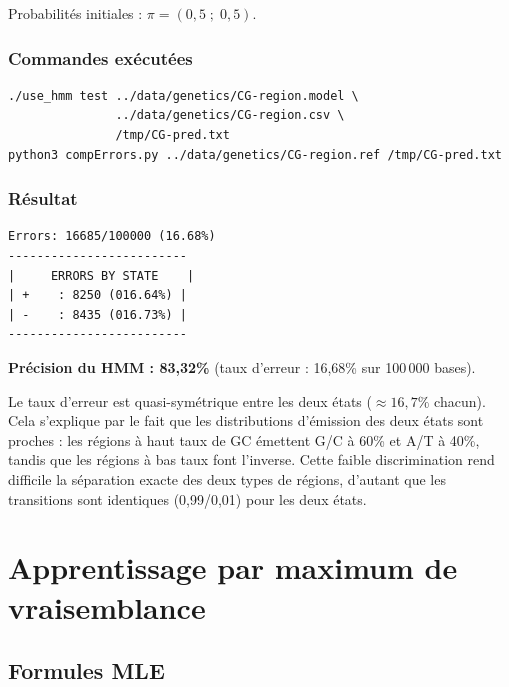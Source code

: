 \documentclass[12pt,a4paper]{article}
\begin{document}
Probabilités initiales : $\pi = (0{,}5 \;;\; 0{,}5)$.

\subsubsection*{Commandes exécutées}

\begin{lstlisting}[style=bashstyle]
./use_hmm test ../data/genetics/CG-region.model \
               ../data/genetics/CG-region.csv \
               /tmp/CG-pred.txt
python3 compErrors.py ../data/genetics/CG-region.ref /tmp/CG-pred.txt
\end{lstlisting}

\subsubsection*{Résultat}

\begin{lstlisting}[style=outputstyle]
Errors: 16685/100000 (16.68%)
-------------------------
|     ERRORS BY STATE    |
| +    : 8250 (016.64%) |
| -    : 8435 (016.73%) |
-------------------------
\end{lstlisting}

\begin{resultbox}
\textbf{Précision du HMM : 83,32\%} (taux d'erreur : 16,68\% sur 100\,000 bases).
\end{resultbox}

\begin{notebox}
Le taux d'erreur est quasi-symétrique entre les deux états ($\approx 16{,}7\%$ chacun).
Cela s'explique par le fait que les distributions d'émission des deux états sont proches :
les régions à haut taux de GC émettent G/C à 60\% et A/T à 40\%, tandis que les régions
à bas taux font l'inverse. Cette faible discrimination rend difficile la séparation exacte
des deux types de régions, d'autant que les transitions sont identiques (0,99/0,01)
pour les deux états.
\end{notebox}

\section{Apprentissage par maximum de vraisemblance}

\subsection{Formules MLE}
\end{document}
